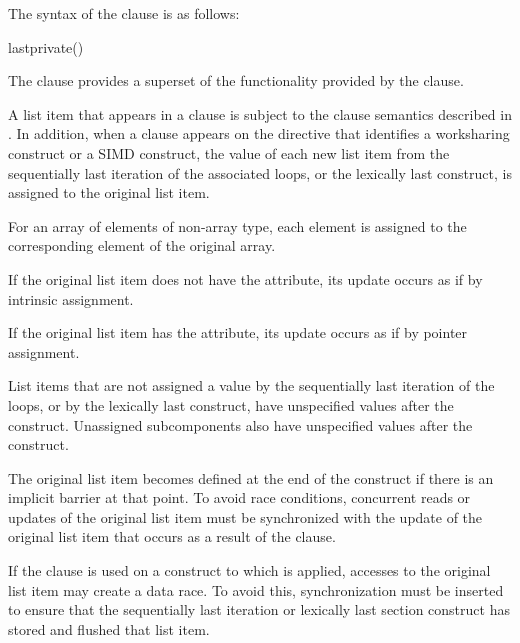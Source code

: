 {{{{\syntax
The syntax of the  clause is as follows:

\begin{boxedcode}
lastprivate()
\end{boxedcode}

\descr
The  clause provides a superset of the functionality provided by the 
 clause.

A list item that appears in a  clause is subject to the  clause 
semantics described in 
. 
In addition, when a 
 clause appears on the directive that identifies a worksharing construct 
or a SIMD construct, the value of each new list item from the sequentially last iteration 
of the associated loops, or the lexically last  construct, is assigned to the 
original list item. 

\ccppspecificstart
For an array of elements of non-array type, each element is assigned to the 
corresponding element of the original array.
\ccppspecificend
\bigskip

\fortranspecificstart
If the original list item does not have the  attribute, its update occurs as if by 
intrinsic assignment.

\pagebreak

If the original list item has the  attribute, its update occurs as if by pointer 
assignment.
\fortranspecificend

List items that are not assigned a value by the sequentially last iteration of the loops, or 
by the lexically last  construct, have unspecified values after the construct. 
Unassigned subcomponents also have unspecified values after the construct.

The original list item becomes defined at the end of the construct if there is an implicit 
barrier at that point. To avoid race conditions, concurrent reads or updates of the original 
list item must be synchronized with the update of the original list item that occurs as a 
result of the  clause.

If the  clause is used on a construct to which  is applied, 
accesses to the original list item may create a data race. To avoid this, synchronization 
must be inserted to ensure that the sequentially last iteration or lexically last section 
construct has stored and flushed that list item.

}}}}
